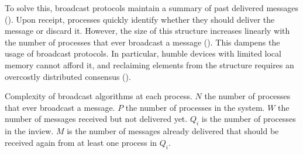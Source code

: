 To solve this, broadcast protocols maintain a summary of past delivered messages
(\REF). Upon receipt, processes quickly identify whether they should deliver the
message or discard it. However, the size of this structure increases linearly
with the number of processes that ever broadcast a message (\REF). This dampens
the usage of broadcast protocols. In particular, humble devices with limited
local memory cannot afford it, and reclaiming elements from the structure
requires an overcostly distributed consensus (\REF).



\begin{table}
  \begin{center}
    \caption{\label{table:complexity} Complexity of broadcast algorithms at each
      process. $N$ the number of processes that ever broadcast a message. $P$
      the number of processes in the system. $W$ the number of messages received
      but not delivered yet. $Q_i$ is the number of processes in the inview. $M$
      is the number of messages already delivered that should be received again
      from at least one process in $Q_i$.}
    
  \end{center}
\end{table}

